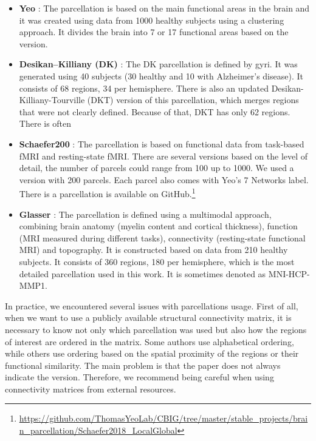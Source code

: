\begin{itemize}

    \item \textbf{Yeo}\label{parc:Yeo} \cite{thomas_yeo_organization_2011}: The parcellation is based on the main functional areas in the brain and it was created using data from 1000 healthy subjects using a clustering approach. It divides the brain into 7 or 17 functional areas based on the version.
    
    \item \textbf{Desikan–Killiany (DK)}\label{parc:DK}  \cite{desikan_automated_2006}: The DK parcellation is defined by gyri. It was generated using 40 subjects (30 healthy and 10 with Alzheimer’s disease). It consists of 68 regions, 34 per hemisphere. There is also an updated Desikan-Killiany-Tourville (DKT) \cite{klein_101_2012} version of this parcellation, which merges regions that were not clearly defined. Because of that, DKT has only 62 regions. There is often 
    
    \item \textbf{Schaefer200}\label{parc:Schaefer200}  \cite{schaefer_local-global_2018}: The parcellation is based on functional data from task-based fMRI and resting-state fMRI. There are several versions based on the level of detail, the number of parcels could range from 100 up to 1000. We used a version with 200 parcels. Each parcel also comes with Yeo's 7 Networks label.
    There is a parcellation is available on GitHub.\footnote{\url{https://github.com/ThomasYeoLab/CBIG/tree/master/stable_projects/brain_parcellation/Schaefer2018_LocalGlobal}}
    
    \item \textbf{Glasser}\label{parc:Glasser}  \cite{glasser_multi-modal_2016}: The parcellation is defined using a multimodal approach, combining brain anatomy (myelin content and cortical thickness), function (MRI measured during different tasks), connectivity (resting-state functional MRI) and topography. It is constructed based on data from 210 healthy subjects. It consists of 360 regions, 180 per hemisphere, which is the most detailed parcellation used in this work. It is sometimes denoted as MNI-HCP-MMP1.
    
\end{itemize}

In practice, we encountered several issues with parcellations usage. First of all, when we want to use a publicly available structural connectivity matrix, it is necessary to know not only which parcellation was used but also how the regions of interest are ordered in the matrix. Some authors use alphabetical ordering, while others use ordering based on the spatial proximity of the regions or their functional similarity. The main problem is that the paper does not always indicate the version. Therefore, we recommend being careful when using connectivity matrices from external resources.

